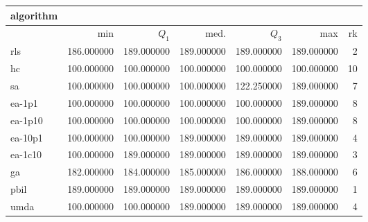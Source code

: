 \begin{tabular}{@{}l*{5}{>{{}}N{3}{0}}>{{}}N{2}{0}@{}}
\toprule
{algorithm} &  \\
\midrule
& {min} & {$Q_1$} & {med.} & {$Q_3$} & {max} & {rk}\\
\midrule
rls & 186.000000 & {\color{blue}} 189.000000 & {\color{blue}} 189.000000 & {\color{blue}} 189.000000 & {\color{blue}} 189.000000 & 2\\
hc & 100.000000 & 100.000000 & 100.000000 & 100.000000 & 100.000000 & 10\\
sa & 100.000000 & 100.000000 & 100.000000 & 122.250000 & {\color{blue}} 189.000000 & 7\\
ea-1p1 & 100.000000 & 100.000000 & 100.000000 & 100.000000 & {\color{blue}} 189.000000 & 8\\
ea-1p10 & 100.000000 & 100.000000 & 100.000000 & 100.000000 & {\color{blue}} 189.000000 & 8\\
ea-10p1 & 100.000000 & 100.000000 & {\color{blue}} 189.000000 & {\color{blue}} 189.000000 & {\color{blue}} 189.000000 & 4\\
ea-1c10 & 100.000000 & {\color{blue}} 189.000000 & {\color{blue}} 189.000000 & {\color{blue}} 189.000000 & {\color{blue}} 189.000000 & 3\\
ga & 182.000000 & 184.000000 & 185.000000 & 186.000000 & 188.000000 & 6\\
pbil & {\color{blue}} 189.000000 & {\color{blue}} 189.000000 & {\color{blue}} 189.000000 & {\color{blue}} 189.000000 & {\color{blue}} 189.000000 & 1\\
umda & 100.000000 & 100.000000 & {\color{blue}} 189.000000 & {\color{blue}} 189.000000 & {\color{blue}} 189.000000 & 4\\
\bottomrule
\end{tabular}
